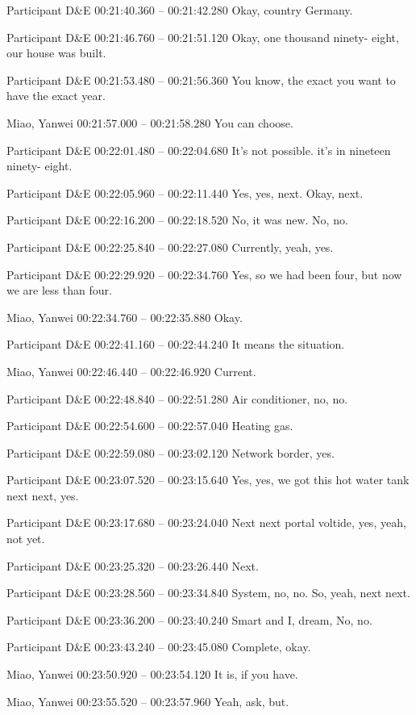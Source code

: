 {Participant D\&E 00:21:40.360 -- 00:21:42.280
Okay, country Germany.

Participant D\&E 00:21:46.760 -- 00:21:51.120
Okay, one thousand ninety- eight, our house was built.

Participant D\&E 00:21:53.480 -- 00:21:56.360
You know, the exact you want to have the exact year.

Miao, Yanwei 00:21:57.000 -- 00:21:58.280
You can choose.

Participant D\&E 00:22:01.480 -- 00:22:04.680
It's not possible. it's in nineteen ninety- eight.

Participant D\&E 00:22:05.960 -- 00:22:11.440
Yes, yes, next. Okay, next.

Participant D\&E 00:22:16.200 -- 00:22:18.520
No, it was new. No, no.

Participant D\&E 00:22:25.840 -- 00:22:27.080
Currently, yeah, yes.

Participant D\&E 00:22:29.920 -- 00:22:34.760
Yes, so we had been four, but now we are less than four.

Miao, Yanwei 00:22:34.760 -- 00:22:35.880
Okay.

Participant D\&E 00:22:41.160 -- 00:22:44.240
It means the situation.

Miao, Yanwei 00:22:46.440 -- 00:22:46.920
Current.

Participant D\&E 00:22:48.840 -- 00:22:51.280
Air conditioner, no, no.

Participant D\&E 00:22:54.600 -- 00:22:57.040
Heating gas.

Participant D\&E 00:22:59.080 -- 00:23:02.120
Network border, yes.

Participant D\&E 00:23:07.520 -- 00:23:15.640
Yes, yes, we got this hot water tank next next, yes.

Participant D\&E 00:23:17.680 -- 00:23:24.040
Next next portal voltide, yes, yeah, not yet.

Participant D\&E 00:23:25.320 -- 00:23:26.440
Next.

Participant D\&E 00:23:28.560 -- 00:23:34.840
System, no, no. So, yeah, next next.

Participant D\&E 00:23:36.200 -- 00:23:40.240
Smart and I, dream, No, no.

Participant D\&E 00:23:43.240 -- 00:23:45.080
Complete, okay.

Miao, Yanwei 00:23:50.920 -- 00:23:54.120
It is, if you have.

Miao, Yanwei 00:23:55.520 -- 00:23:57.960
Yeah, ask, but.

}
